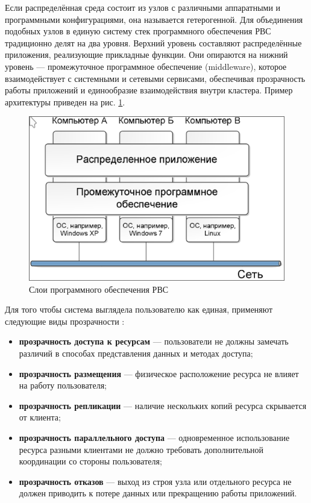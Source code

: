 Если распределённая среда состоит из узлов с различными аппаратными и
программными конфигурациями, она называется гетерогенной. Для объединения
подобных узлов в единую систему стек программного обеспечения РВС традиционно
делят на два уровня. Верхний уровень составляют распределённые приложения,
реализующие прикладные функции. Они опираются на нижний уровень — промежуточное
программное обеспечение (middleware), которое взаимодействует с системными и
сетевыми сервисами, обеспечивая прозрачность работы приложений и единообразие
взаимодействия внутри кластера. Пример архитектуры приведен на рис.
\ref{fig:distributed-architecture}.

\begin{figure}
  \centering
  \includegraphics[scale=0.4]{inc/distr-arch.png}
  \caption{Слои программного обеспечения РВС \cite{radchenko2012}}
  \label{fig:distributed-architecture}
\end{figure}

Для того чтобы система выглядела пользователю как единая, применяют следующие
виды прозрачности \cite{radchenko2012}:

\begin{itemize}
    \item \textbf{прозрачность доступа к ресурсам} — пользователи не должны
    замечать различий в способах представления данных и методах доступа;
    \item \textbf{прозрачность размещения} — физическое расположение ресурса не
    влияет на работу пользователя;
    \item \textbf{прозрачность репликации} — наличие нескольких копий ресурса
    скрывается от клиента;
    \item \textbf{прозрачность параллельного доступа} — одновременное
    использование ресурса разными клиентами не должно требовать дополнительной
    координации
    со стороны пользователя;
    \item \textbf{прозрачность отказов} — выход из строя узла или отдельного
    ресурса не должен приводить к потере данных или прекращению работы
    приложений.
\end{itemize}

